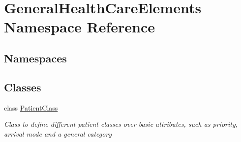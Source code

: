 \hypertarget{namespace_general_health_care_elements}{}\section{General\+Health\+Care\+Elements Namespace Reference}
\label{namespace_general_health_care_elements}
\subsection*{Namespaces}
\begin{DoxyCompactItemize}
\end{DoxyCompactItemize}
\subsection*{Classes}
\begin{DoxyCompactItemize}
\item 
class \hyperlink{class_general_health_care_elements_1_1_patient_class}{Patient\+Class}
\begin{DoxyCompactList}\small\item\em Class to define different patient classes over basic attributes, such as priority, arrival mode and a general category \end{DoxyCompactList}\end{DoxyCompactItemize}
